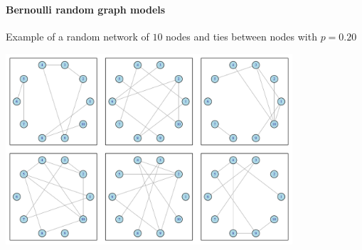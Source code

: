 \documentclass[8pt]{beamer}
\begin{document}

\begin{frame}
\frametitle{\insertsection}
\framesubtitle{Bernoulli random graph models}

Example of a random network of $10$ nodes and ties between nodes with $p=0.20$

\centering
\includegraphics[width=0.8\textwidth]{bernoulli}

\end{frame}

\end{document}
